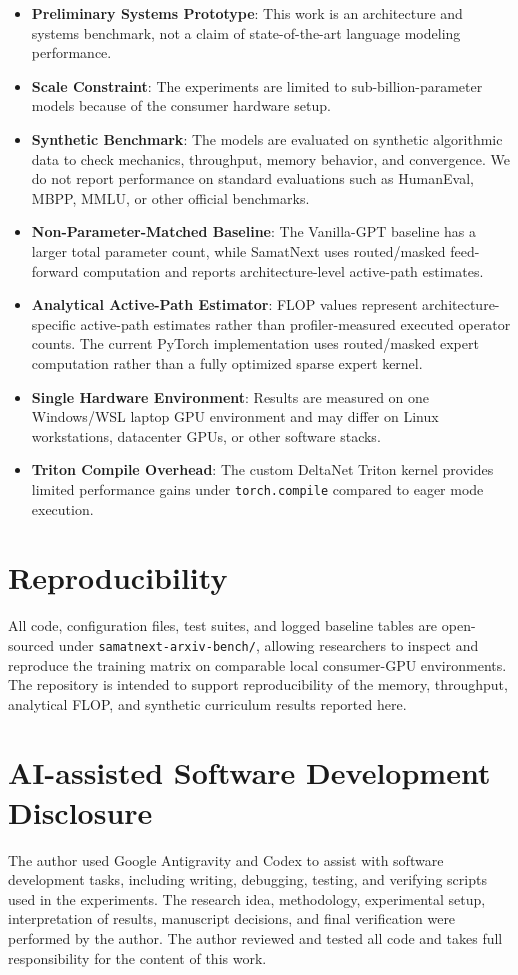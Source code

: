 \documentclass[11pt,a4paper]{article}
\begin{document}
\begin{sloppypar}
\begin{itemize}
\item \textbf{Preliminary Systems Prototype}: This work is an architecture and systems benchmark, not a claim of state-of-the-art language modeling performance.
\item \textbf{Scale Constraint}: The experiments are limited to sub-billion-parameter models because of the consumer hardware setup.
\item \textbf{Synthetic Benchmark}: The models are evaluated on synthetic algorithmic data to check mechanics, throughput, memory behavior, and convergence. We do not report performance on standard evaluations such as HumanEval, MBPP, MMLU, or other official benchmarks.
\item \textbf{Non-Parameter-Matched Baseline}: The Vanilla-GPT baseline has a larger total parameter count, while SamatNext uses routed/masked feed-forward computation and reports architecture-level active-path estimates.
\item \textbf{Analytical Active-Path Estimator}: FLOP values represent architecture-specific active-path estimates rather than profiler-measured executed operator counts. The current PyTorch implementation uses routed/masked expert computation rather than a fully optimized sparse expert kernel.
\item \textbf{Single Hardware Environment}: Results are measured on one Windows/WSL laptop GPU environment and may differ on Linux workstations, datacenter GPUs, or other software stacks.
\item \textbf{Triton Compile Overhead}: The custom DeltaNet Triton kernel provides limited performance gains under \texttt{torch.compile} compared to eager mode execution.
\end{itemize}
\end{sloppypar}

\section{Reproducibility}
All code, configuration files, test suites, and logged baseline tables are open-sourced under \texttt{samatnext-arxiv-bench/}, allowing researchers to inspect and reproduce the training matrix on comparable local consumer-GPU environments. The repository is intended to support reproducibility of the memory, throughput, analytical FLOP, and synthetic curriculum results reported here.

\section{AI-assisted Software Development Disclosure}
The author used Google Antigravity and Codex to assist with software development tasks, including writing, debugging, testing, and verifying scripts used in the experiments. The research idea, methodology, experimental setup, interpretation of results, manuscript decisions, and final verification were performed by the author. The author reviewed and tested all code and takes full responsibility for the content of this work.

\nocite{*}


\end{document}
